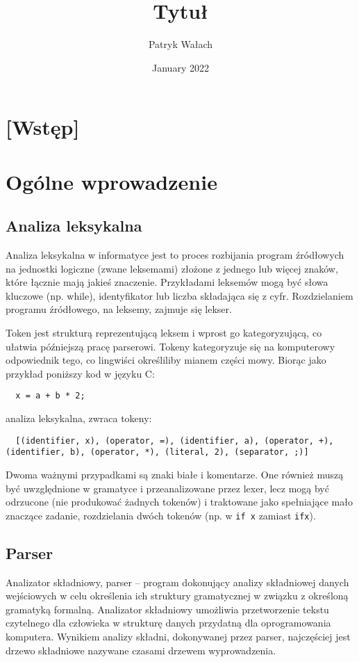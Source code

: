 \documentclass{article}
\title{Tytuł}
\author{Patryk Wałach}
\date{January 2022}
\begin{document}
\maketitle
\tableofcontents

\section{[Wstęp]}

\section{Ogólne wprowadzenie}
\subsection{Analiza leksykalna}
Analiza leksykalna w informatyce jest to proces rozbijania program źródłowych na jednostki logiczne (zwane leksemami) złożone z jednego lub więcej znaków, które łącznie mają jakieś znaczenie\cite{Hopcroft__Motwani__Ullman__2005}. Przykładami leksemów mogą być słowa kluczowe (np. while), identyfikator lub liczba składająca się z cyfr. Rozdzielaniem programu źródłowego, na leksemy, zajmuje się lekser.

Token jest strukturą reprezentującą leksem i wprost go kategoryzującą\cite{ Aho__Sethi__Ullman__1985}, co ułatwia późniejszą pracę parserowi. Tokeny kategoryzuje się na komputerowy odpowiednik tego, co lingwiści określiliby mianem części mowy. Biorąc jako przykład poniższy kod w języku C:
\begin{verbatim}
  x = a + b * 2;
\end{verbatim}
analiza leksykalna, zwraca tokeny:
\begin{verbatim}
  [(identifier, x), (operator, =), (identifier, a), (operator, +), (identifier, b), (operator, *), (literal, 2), (separator, ;)]
\end{verbatim}
Dwoma ważnymi przypadkami są znaki białe i komentarze. One również muszą być uwzględnione w gramatyce i przeanalizowane przez lexer, lecz mogą być odrzucone (nie produkować żadnych tokenów) i traktowane jako spełniające mało znaczące zadanie, rozdzielania dwóch tokenów (np. w \texttt{if x} zamiast \texttt{ifx}).

\subsection{Parser}
Analizator składniowy, parser – program dokonujący analizy składniowej danych wejściowych w celu określenia ich struktury gramatycznej w związku z określoną gramatyką formalną. Analizator składniowy umożliwia przetworzenie tekstu czytelnego dla człowieka w strukturę danych przydatną dla oprogramowania komputera. Wynikiem analizy składni, dokonywanej przez parser, najczęściej jest drzewo składniowe nazywane czasami drzewem wyprowadzenia\cite{Aho__Sethi__Ullman__1985}.
\end{document}
